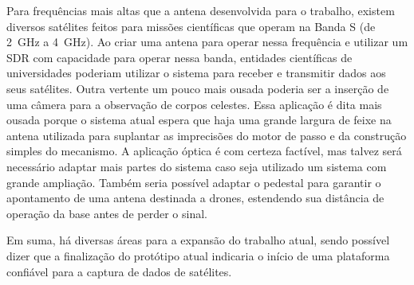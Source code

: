 Para frequências mais altas que a antena desenvolvida para o trabalho, existem diversos satélites feitos para missões científicas que operam na Banda S (de \SI{2}{\giga\hertz} a \SI{4}{\giga\hertz}).
Ao criar uma antena para operar nessa frequência e utilizar um SDR com capacidade para operar nessa banda, entidades científicas de universidades poderiam utilizar o sistema para receber e transmitir dados aos seus satélites.
Outra vertente um pouco mais ousada poderia ser a inserção de uma câmera para a observação de corpos celestes. Essa aplicação é dita mais ousada porque o sistema atual espera que haja uma grande largura de feixe na antena utilizada para suplantar as imprecisões do motor de passo e da construção simples do mecanismo.
A aplicação óptica é com certeza factível, mas talvez será necessário adaptar mais partes do sistema caso seja utilizado um sistema com grande ampliação.
Também seria possível adaptar o pedestal para garantir o apontamento de uma antena destinada a drones, estendendo sua distância de operação da base antes de perder o sinal.

Em suma, há diversas áreas para a expansão do trabalho atual, sendo possível dizer que a finalização do protótipo atual indicaria o início de uma plataforma confiável para a captura de dados de satélites.
